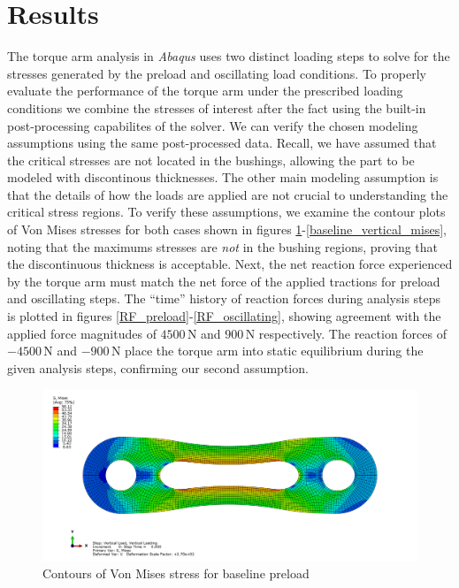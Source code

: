 \documentclass[../main.tex]{subfiles}
\begin{document}
\section{Results}

The torque arm analysis in \textit{Abaqus} uses two distinct loading steps to solve for the stresses generated by the preload and oscillating load conditions.
To properly evaluate the performance of the torque arm under the prescribed loading conditions we combine the stresses of interest after the fact using the built-in post-processing capabilites of the solver.
We can verify the chosen modeling assumptions using the same post-processed data.
Recall, we have assumed that the critical stresses are not located in the bushings, allowing the part to be modeled with discontinous thicknesses.
The other main modeling assumption is that the details of how the loads are applied are not crucial to understanding the critical stress regions. 
To verify these assumptions, we examine the contour plots of Von Mises stresses for both cases shown in figures \ref{baseline_axial_mises}-\ref{baseline_vertical_mises}, noting that the maximums stresses are \textit{not} in the bushing regions, proving that the discontinuous thickness is acceptable.
Next, the net reaction force experienced by the torque arm must match the net force of the applied tractions for preload and oscillating steps.
The ``time'' history of reaction forces during analysis steps is plotted in figures \ref{RF_preload}-\ref{RF_oscillating}, showing agreement with the applied force magnitudes of \(4500\,\unit{\newton}\) and \(900\,\unit{\newton}\) respectively.
The reaction forces of \(-4500\,\unit{\newton}\) and \(-900\,\unit{\newton}\) place the torque arm into static equilibrium during the given analysis steps, confirming our second assumption.

\begin{figure}[H]
    \centering
    \includegraphics[scale=0.2]{../../images/baseline_axial_mises.png}
    \caption{Contours of Von Mises stress for baseline preload}
    \label{baseline_axial_mises}
\end{figure}
\end{document}
